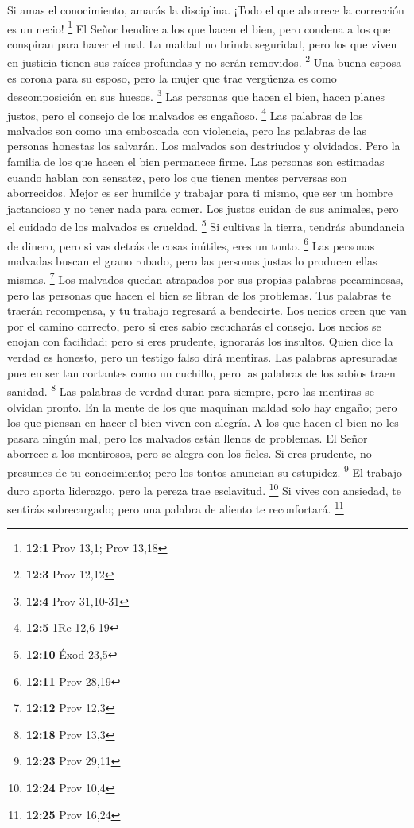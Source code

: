  Si amas el conocimiento, amarás la disciplina. ¡Todo el que
aborrece la corrección es un necio! \footnote{\textbf{12:1} Prov 13,1;
  Prov 13,18}  El Señor bendice a los que hacen el bien,
pero condena a los que conspiran para hacer el mal.  La
maldad no brinda seguridad, pero los que viven en justicia tienen sus
raíces profundas y no serán removidos. \footnote{\textbf{12:3} Prov
  12,12}  Una buena esposa es corona para su esposo, pero la
mujer que trae vergüenza es como descomposición en sus huesos.
\footnote{\textbf{12:4} Prov 31,10-31}  Las personas que
hacen el bien, hacen planes justos, pero el consejo de los malvados es
engañoso. \footnote{\textbf{12:5} 1Re 12,6-19}  Las palabras
de los malvados son como una emboscada con violencia, pero las palabras
de las personas honestas los salvarán.  Los malvados son
destriudos y olvidados. Pero la familia de los que hacen el bien
permanece firme.  Las personas son estimadas cuando hablan
con sensatez, pero los que tienen mentes perversas son aborrecidos.
 Mejor es ser humilde y trabajar para ti mismo, que ser un
hombre jactancioso y no tener nada para comer.  Los justos
cuidan de sus animales, pero el cuidado de los malvados es crueldad.
\footnote{\textbf{12:10} Éxod 23,5}  Si cultivas la tierra,
tendrás abundancia de dinero, pero si vas detrás de cosas inútiles, eres
un tonto. \footnote{\textbf{12:11} Prov 28,19}  Las
personas malvadas buscan el grano robado, pero las personas justas lo
producen ellas mismas. \footnote{\textbf{12:12} Prov 12,3} 
Los malvados quedan atrapados por sus propias palabras pecaminosas, pero
las personas que hacen el bien se libran de los problemas. 
Tus palabras te traerán recompensa, y tu trabajo regresará a bendecirte.
 Los necios creen que van por el camino correcto, pero si
eres sabio escucharás el consejo.  Los necios se enojan con
facilidad; pero si eres prudente, ignorarás los insultos. 
Quien dice la verdad es honesto, pero un testigo falso dirá mentiras.
 Las palabras apresuradas pueden ser tan cortantes como un
cuchillo, pero las palabras de los sabios traen sanidad. \footnote{\textbf{12:18}
  Prov 13,3}  Las palabras de verdad duran para siempre,
pero las mentiras se olvidan pronto.  En la mente de los
que maquinan maldad solo hay engaño; pero los que piensan en hacer el
bien viven con alegría.  A los que hacen el bien no les
pasara ningún mal, pero los malvados están llenos de problemas.
 El Señor aborrece a los mentirosos, pero se alegra con los
fieles.  Si eres prudente, no presumes de tu conocimiento;
pero los tontos anuncian su estupidez. \footnote{\textbf{12:23} Prov
  29,11}  El trabajo duro aporta liderazgo, pero la pereza
trae esclavitud. \footnote{\textbf{12:24} Prov 10,4}  Si
vives con ansiedad, te sentirás sobrecargado; pero una palabra de
aliento te reconfortará. \footnote{\textbf{12:25} Prov 16,24}

